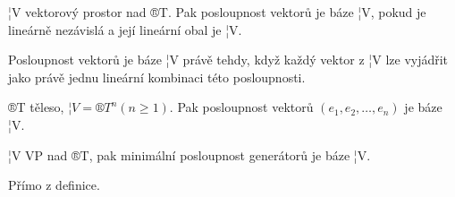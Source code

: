 \documentclass[12pt]{article}					%
\begin{document}

        \begin{definice}[Báze]
            ¦V vektorový prostor nad ®T. Pak posloupnost vektorů je báze ¦V, pokud je lineárně nezávislá a její lineární obal je ¦V.
        \end{definice}
        \begin{dusledek}
            Posloupnost vektorů je báze ¦V právě tehdy, když každý vektor z ¦V lze vyjádřit jako právě jednu lineární kombinaci této posloupnosti.
        \end{dusledek}

        \begin{definice}
            ®T těleso, $¦V = ®T^n (n≥1)$. Pak posloupnost vektorů $(e_1, e_2, …, e_n)$ je báze ¦V.
        \end{definice}

        \begin{tvrzeni}
            ¦V VP nad ®T, pak minimální posloupnost generátorů je báze ¦V.
            \begin{dukazin}
                Přímo z definice.
            \end{dukazin}
        \end{tvrzeni}
\end{document}
